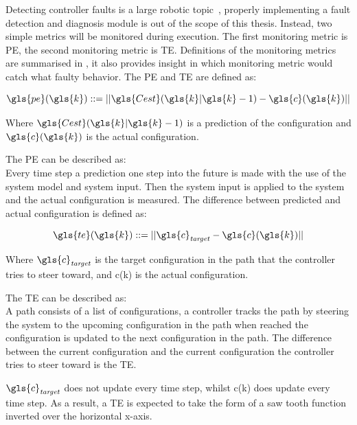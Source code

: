 Detecting controller faults is a large robotic topic~\cite{khalastchi_fault_2019}, properly implementing a fault detection and diagnosis module is out of the scope of this thesis. Instead, two simple metrics will be monitored during execution. The first monitoring metric is \ac{PE}, the second monitoring metric is \ac{TE}. Definitions of the monitoring metrics are summarised in , it also provides insight in which monitoring metric would catch what faulty behavior. The \ac{PE} and \ac{TE} are defined as:\bs

\[ \gls{pe}(\gls{k}) ::= ||\gls{Cest}(\gls{k}|\gls{k}-1) - \gls{c}(\gls{k})|| \]

Where $\gls{Cest}(\gls{k}|\gls{k}-1)$ is a prediction of the configuration and $\gls{c}(\gls{k})$ is the actual configuration.\bs

The \acl{PE} can be described as:\\
Every time step a prediction one step into the future is made with the use of the system model and system input. Then the system input is applied to the system and the actual configuration is measured. The difference between predicted and actual configuration is defined as:\bs

\[ \gls{te}(\gls{k}) ::= ||\gls{c}_\mathit{target} - \gls{c}(\gls{k})|| \]

Where $\gls{c}_\mathit{target}$ is the target configuration in the path that the controller tries to steer toward, and \gls{c}(\gls{k}) is the actual configuration.\bs

The \acl{TE} can be described as:\\ A path consists of a list of configurations, a controller tracks the path by steering the system to the upcoming configuration in the path when reached the configuration is updated to the next configuration in the path. The difference between the current configuration and the current configuration the controller tries to steer toward is the \ac{TE}.\bs

$\gls{c}_\mathit{target}$ does not update every time step, whilst \gls{c}(\gls{k}) does update every time step. As a result, a  \ac{TE} is expected to take the form of a saw tooth function inverted over the horizontal x-axis.\bs


